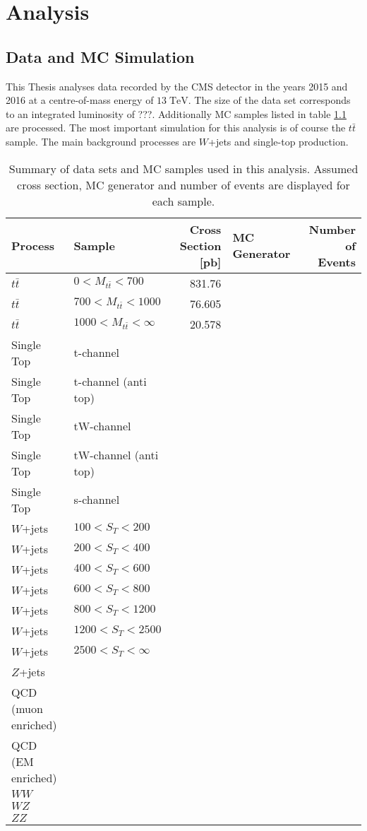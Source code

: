 \chapter{Analysis}
\section{Data and MC Simulation}
	This Thesis analyses data recorded by the CMS detector in the years 2015 and 2016 at a centre-of-mass energy of $13\;\text{TeV}$. The size of the data set corresponds to an integrated luminosity of ???. Additionally MC samples listed in table \ref{MC_Tab} are processed. The most important simulation for this analysis is of course the $t\bar{t}$ sample. The main background processes are $W$+jets and single-top production.
	
	\begin{landscape}
	\begin{table}
	\centering
	 \begin{tabular}{|l|l|r|l|r|}
	 	\hline
	 	Process & Sample & Cross Section [pb] & MC Generator & Number of Events \\
	 	\hline
	 	$t\bar{t}$ & $0 < M_{t\bar{t}} < 700$ & 831.76 & & \\
	 	$t\bar{t}$ & $700 < M_{t\bar{t}} < 1000$ & 76.605 & & \\
	 	$t\bar{t}$ & $1000 < M_{t\bar{t}} < \infty$ & 20.578 & & \\
	 	\hline
		Single Top &t-channel  & & & \\
		Single Top & t-channel (anti top) & & & \\
		Single Top & tW-channel & & & \\
		Single Top & tW-channel (anti top) & & & \\
		Single Top & s-channel & & & \\
		$W$+jets & $100 < S_T < 200$ & & & \\
	 	$W$+jets & $200 < S_T < 400$ & & & \\
	 	$W$+jets & $400 < S_T < 600$ & & & \\
	 	$W$+jets & $600 < S_T < 800$ & & & \\
	 	$W$+jets & $800 < S_T < 1200$ & & & \\
	 	$W$+jets & $1200 < S_T < 2500$ & & & \\
	 	$W$+jets & $2500 < S_T < \infty$ & & & \\
	 	$Z$+jets & & & & \\
	 	QCD (muon enriched) & & & & \\
	 	QCD (EM enriched) & & & & \\
	 	$WW$& & & & \\
	 	$WZ$& & & & \\
	 	$ZZ$& & & & \\
	 	 \hline
	 \end{tabular}
	\caption{Summary of data sets and MC samples used in this analysis. Assumed cross section, MC generator and number of events are displayed for each sample.}
	\label{MC_Tab}	
	\end{table}
	\end{landscape}
	

